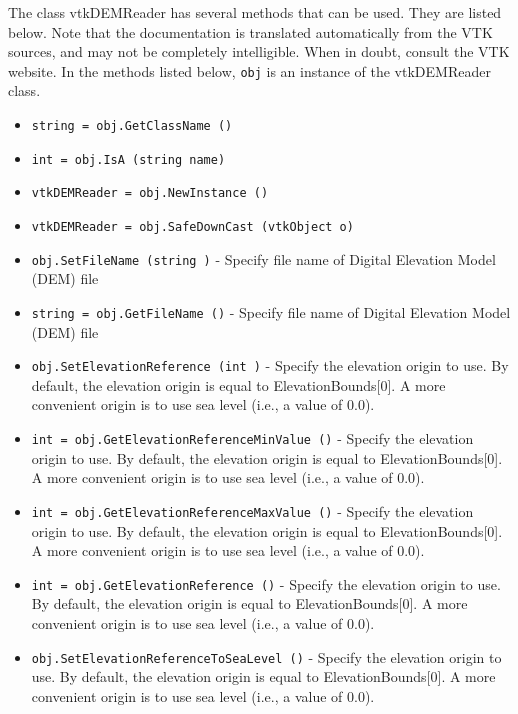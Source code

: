 The class vtkDEMReader has several methods that can be used.
  They are listed below.
Note that the documentation is translated automatically from the VTK sources,
and may not be completely intelligible.  When in doubt, consult the VTK website.
In the methods listed below, \verb|obj| is an instance of the vtkDEMReader class.
\begin{itemize}
\item  \verb|string = obj.GetClassName ()|

\item  \verb|int = obj.IsA (string name)|

\item  \verb|vtkDEMReader = obj.NewInstance ()|

\item  \verb|vtkDEMReader = obj.SafeDownCast (vtkObject o)|

\item  \verb|obj.SetFileName (string )| -  Specify file name of Digital Elevation Model (DEM) file

\item  \verb|string = obj.GetFileName ()| -  Specify file name of Digital Elevation Model (DEM) file

\item  \verb|obj.SetElevationReference (int )| -  Specify the elevation origin to use. By default, the elevation origin
 is equal to ElevationBounds[0]. A more convenient origin is to use sea
 level (i.e., a value of 0.0).

\item  \verb|int = obj.GetElevationReferenceMinValue ()| -  Specify the elevation origin to use. By default, the elevation origin
 is equal to ElevationBounds[0]. A more convenient origin is to use sea
 level (i.e., a value of 0.0).

\item  \verb|int = obj.GetElevationReferenceMaxValue ()| -  Specify the elevation origin to use. By default, the elevation origin
 is equal to ElevationBounds[0]. A more convenient origin is to use sea
 level (i.e., a value of 0.0).

\item  \verb|int = obj.GetElevationReference ()| -  Specify the elevation origin to use. By default, the elevation origin
 is equal to ElevationBounds[0]. A more convenient origin is to use sea
 level (i.e., a value of 0.0).

\item  \verb|obj.SetElevationReferenceToSeaLevel ()| -  Specify the elevation origin to use. By default, the elevation origin
 is equal to ElevationBounds[0]. A more convenient origin is to use sea
 level (i.e., a value of 0.0).


\end{itemize}
